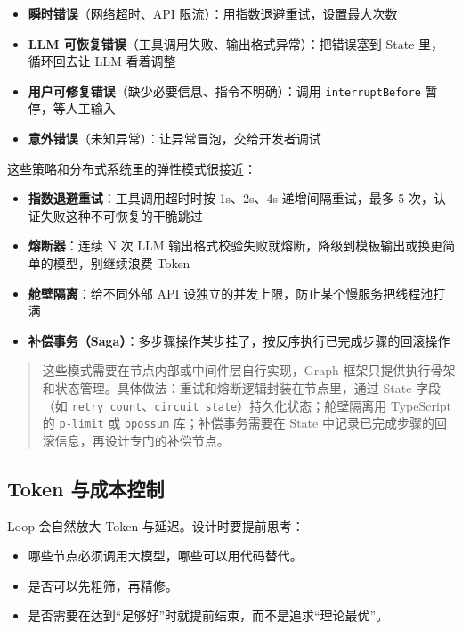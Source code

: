 \documentclass[9pt,a4paper,twocolumn]{ctexart}
\begin{document}
\begin{itemize}[itemsep=1pt, topsep=2pt]
  \item \textbf{瞬时错误}（网络超时、API 限流）：用指数退避重试，设置最大次数
  \item \textbf{LLM 可恢复错误}（工具调用失败、输出格式异常）：把错误塞到 State 里，循环回去让 LLM 看着调整
  \item \textbf{用户可修复错误}（缺少必要信息、指令不明确）：调用 \texttt{interruptBefore} 暂停，等人工输入
  \item \textbf{意外错误}（未知异常）：让异常冒泡，交给开发者调试
\end{itemize}


这些策略和分布式系统里的弹性模式很接近：


\begin{itemize}[itemsep=1pt, topsep=2pt]
  \item \textbf{指数退避重试}：工具调用超时时按 1s、2s、4s 递增间隔重试，最多 5 次，认证失败这种不可恢复的干脆跳过
  \item \textbf{熔断器}：连续 N 次 LLM 输出格式校验失败就熔断，降级到模板输出或换更简单的模型，别继续浪费 Token
  \item \textbf{舱壁隔离}：给不同外部 API 设独立的并发上限，防止某个慢服务把线程池打满
  \item \textbf{补偿事务（Saga）}：多步骤操作某步挂了，按反序执行已完成步骤的回滚操作
\end{itemize}


\begin{quote}
这些模式需要在节点内部或中间件层自行实现，Graph 框架只提供执行骨架和状态管理。具体做法：重试和熔断逻辑封装在节点里，通过 State 字段（如 \texttt{retry\_count}、\texttt{circuit\_state}）持久化状态；舱壁隔离用 TypeScript 的 \texttt{p-limit} 或 \texttt{opossum} 库；补偿事务需要在 State 中记录已完成步骤的回滚信息，再设计专门的补偿节点。
\end{quote}



\subsection*{Token 与成本控制}


Loop 会自然放大 Token 与延迟。设计时要提前思考：


\begin{itemize}[itemsep=1pt, topsep=2pt]
  \item 哪些节点必须调用大模型，哪些可以用代码替代。
  \item 是否可以先粗筛，再精修。
  \item 是否需要在达到“足够好”时就提前结束，而不是追求“理论最优”。
\end{itemize}
\end{document}
